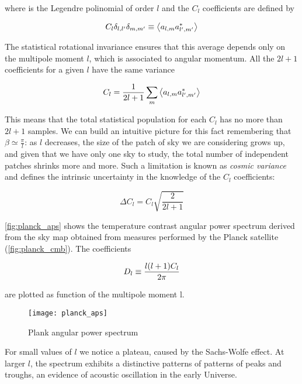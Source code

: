 where is the Legendre polinomial of order $l$ and the $C_l$ coefficients
are defined by

\begin{equation}
        C_l \delta_{l,l'} \delta_{m,m'} \equiv \expval{a_{l,m} a^*_{l',m'}}
\end{equation}

The statistical rotational
invariance ensures that this average depends only on the multipole moment
$l$, which is associated to angular momentum. All the $2l + 1$ coefficients
for a given $l$ have the same variance

\begin{equation}
        C_l = \frac{1}{2l + 1} \sum_m \expval{a_{l,m} a^*_{l',m'}}
\end{equation}

This means that the total statistical population for each $C_l$ has no more
than $2l + 1$ samples. We can build an intuitive picture for this fact
remembering that $\beta \simeq \frac{\pi}{l}$: as $l$ decreases, the size of
the patch of sky we are considering grows up, and given that we have only
one sky to study, the total number of independent patches shrinks more and
more. Such a limitation is known as \emph{cosmic variance} and defines the
intrinsic uncertainty in the knowledge of the $C_l$ coefficients:

\begin{equation}
        \Delta C_l = C_l \sqrt{\frac{2}{2l + 1}}
\end{equation}

\autoref{fig:planck_aps} shows the temperature contrast angular power
spectrum derived from the sky map obtained from measures performed by the
Planck satellite (\autoref{fig:planck_cmb}). The coefficients

\begin{equation}
        D_l \equiv \frac{l\qty(l + 1)C_l}{2\pi}
\end{equation}

are plotted as function of the multipole moment l.

\begin{figure}
        \centering
        \texttt{[image: planck\_aps]}
        \caption{Plank angular power spectrum}
        \label{fig:planck_aps}
\end{figure}

For small values of $l$ we notice a plateau, caused by the Sachs-Wolfe
effect. At larger $l$, the spectrum exhibits a distinctive patterns of
patterns of peaks and troughs, an evidence of acoustic oscillation in the
early Universe.

